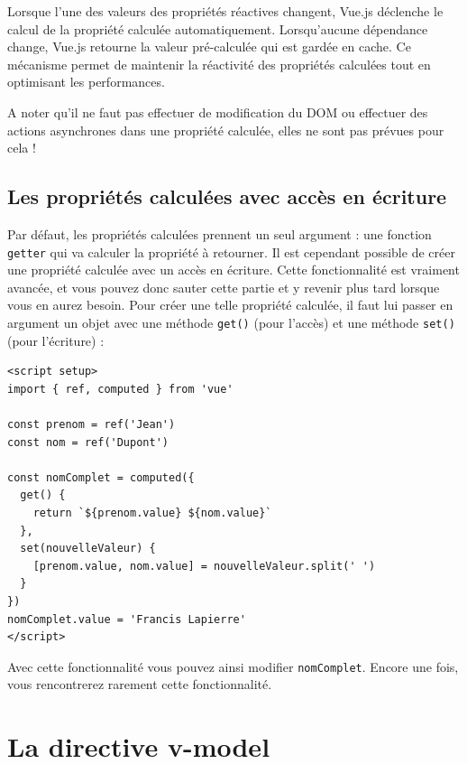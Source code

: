 \documentclass{article}
\begin{document}
Lorsque l'une des valeurs des propriétés réactives changent, {\color{monOrange}Vue.js} déclenche le calcul de la propriété calculée automatiquement. Lorsqu'aucune dépendance change, {\color{monOrange}Vue.js} retourne la valeur pré-calculée qui est gardée en cache. Ce mécanisme permet de maintenir la réactivité des propriétés calculées tout en optimisant les performances.

A noter qu'il ne faut pas effectuer de modification du DOM ou effectuer des actions asynchrones dans une propriété calculée, elles ne sont pas prévues pour cela !



\subsection{Les propriétés calculées avec accès en écriture}
Par défaut, les propriétés calculées prennent un seul argument : une fonction {\tt getter} qui va calculer la propriété à retourner. Il est cependant possible de créer une propriété calculée avec un accès en écriture. Cette fonctionnalité est vraiment avancée, et vous pouvez donc sauter cette partie et y revenir plus tard lorsque vous en aurez besoin. Pour créer une telle propriété calculée, il faut lui passer en argument un objet avec une méthode {\tt get()} (pour l'accès) et une méthode {\tt set()} (pour l'écriture) :
\begin{verbatim}
<script setup>
import { ref, computed } from 'vue'

const prenom = ref('Jean')
const nom = ref('Dupont')

const nomComplet = computed({
  get() {
    return `${prenom.value} ${nom.value}`
  },
  set(nouvelleValeur) {
    [prenom.value, nom.value] = nouvelleValeur.split(' ')
  }
})
nomComplet.value = 'Francis Lapierre'
</script>
\end{verbatim}
Avec cette fonctionnalité vous pouvez ainsi modifier {\tt nomComplet}. Encore une fois, vous rencontrerez rarement cette fonctionnalité.



\section{La directive v-model}
\end{document}
